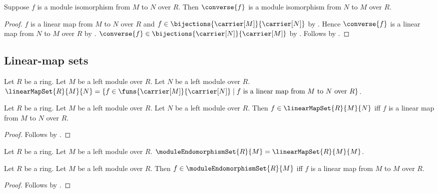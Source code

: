\begin{theorem}\label{module_isomorphism_converse}
    Suppose $f$ is a module isomorphism from $M$ to $N$ over $R$.
    Then $\converse{f}$ is a module isomorphism from $N$ to $M$ over $R$.
\end{theorem}
\begin{proof}
    $f$ is a linear map from $M$ to $N$ over $R$ and
        $f\in\bijections{\carrier[M]}{\carrier[N]}$ by
        .
    Hence $\converse{f}$ is a linear map from $N$ to $M$ over $R$ by
        .
    $\converse{f}\in\bijections{\carrier[N]}{\carrier[M]}$ by
        .
    Follows by .
\end{proof}

\subsection{Linear-map sets}

\begin{definition}\label{linear_map_set}
    Let $R$ be a ring.
    Let $M$ be a left module over $R$.
    Let $N$ be a left module over $R$.
    $\linearMapSet{R}{M}{N}=
        \{f\in\funs{\carrier[M]}{\carrier[N]}\mid
            \text{$f$ is a linear map from $M$ to $N$ over $R$}\}$.
\end{definition}

\begin{proposition}\label{linear_map_set_iff}
    Let $R$ be a ring.
    Let $M$ be a left module over $R$.
    Let $N$ be a left module over $R$.
    Then $f\in\linearMapSet{R}{M}{N}$ iff
        $f$ is a linear map from $M$ to $N$ over $R$.
\end{proposition}
\begin{proof}
    Follows by .
\end{proof}

\begin{definition}\label{module_endomorphism_set}
    Let $R$ be a ring.
    Let $M$ be a left module over $R$.
    $\moduleEndomorphismSet{R}{M}=\linearMapSet{R}{M}{M}$.
\end{definition}

\begin{proposition}\label{module_endomorphism_set_iff}
    Let $R$ be a ring.
    Let $M$ be a left module over $R$.
    Then $f\in\moduleEndomorphismSet{R}{M}$ iff
        $f$ is a linear map from $M$ to $M$ over $R$.
\end{proposition}
\begin{proof}
    Follows by
        .
\end{proof}
